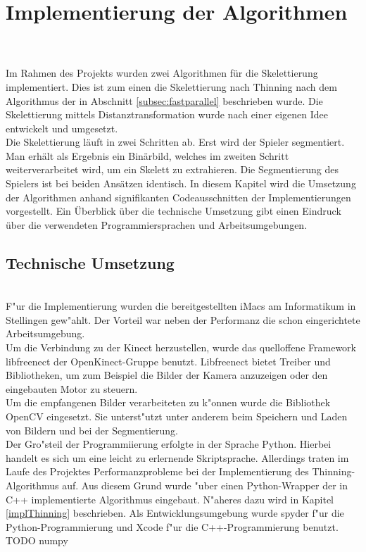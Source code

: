 \chapter{Implementierung der Algorithmen}
\\\\
Im Rahmen des Projekts wurden zwei Algorithmen für die Skelettierung implementiert. Dies ist zum einen
die Skelettierung nach Thinning nach dem Algorithmus der in Abschnitt \ref{subsec:fastparallel} beschrieben wurde. Die Skelettierung mittels Distanztransformation wurde nach einer eigenen Idee entwickelt und
umgesetzt.\\
Die Skelettierung läuft in zwei Schritten ab. Erst wird der Spieler segmentiert. Man erhält als
Ergebnis ein Binärbild, welches im zweiten Schritt weiterverarbeitet wird, um ein Skelett zu extrahieren. 
Die Segmentierung des Spielers ist bei beiden Ansätzen identisch.
In diesem Kapitel wird die Umsetzung der Algorithmen anhand signifikanten Codeausschnitten der Implementierungen vorgestellt. Ein Überblick über die technische Umsetzung gibt einen Eindruck über die
verwendeten Programmiersprachen und Arbeitsumgebungen.
\section{Technische Umsetzung}
\\
F"ur die Implementierung wurden die bereitgestellten iMacs am Informatikum in Stellingen gew"ahlt. Der Vorteil war neben der Performanz die schon eingerichtete Arbeitsumgebung.\\
Um die Verbindung zu der Kinect herzustellen, wurde das quelloffene Framework libfreenect  der OpenKinect-Gruppe benutzt. Libfreenect bietet Treiber und Bibliotheken, um zum Beispiel die Bilder der Kamera anzuzeigen oder den eingebauten Motor zu steuern. \\
Um die empfangenen Bilder verarbeiteten zu k"onnen wurde die Bibliothek OpenCV eingesetzt. Sie unterst"utzt unter anderem beim Speichern und Laden von Bildern und bei der Segmentierung. \\
Der Gro"steil der Programmiierung erfolgte in der Sprache Python. Hierbei handelt es sich um eine leicht zu erlernende Skriptsprache. Allerdings traten im Laufe des Projektes Performanzprobleme bei der Implementierung des Thinning-Algorithmus auf. Aus diesem Grund wurde "uber einen Python-Wrapper der in C++ implementierte Algorithmus eingebaut. N"aheres dazu wird in Kapitel \ref{implThinning} beschrieben.
Als Entwicklungsumgebung wurde spyder f"ur die Python-Programmierung und Xcode f"ur die C++-Programmierung benutzt.
TODO numpy
